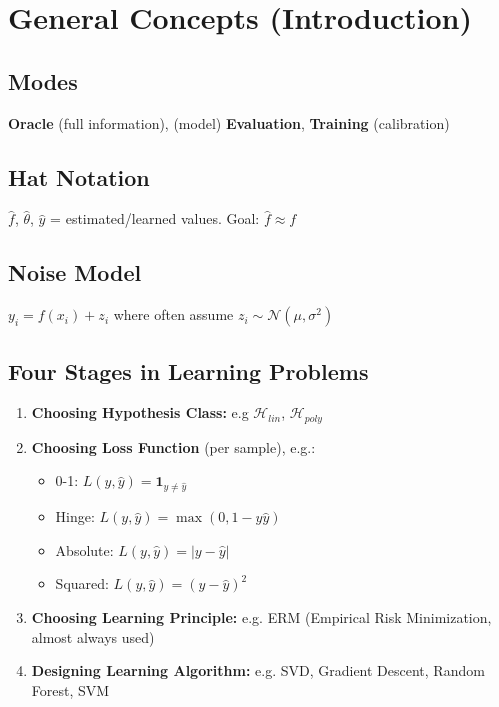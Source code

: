 \section{General Concepts (Introduction)}

\subsection{Modes}
\textbf{Oracle} (full information), (model) \textbf{Evaluation}, \textbf{Training} (calibration)

\subsection{Hat Notation}
$\hat{f}$, $\hat{\theta}$, $\hat{y}$ = estimated/learned values. Goal: $\hat{f} \approx f$

\subsection{Noise Model}
$y_i = f(x_i) + z_i$ where often assume $z_i \sim \mathcal{N}(\mu, \sigma^2)$

\subsection{Four Stages in Learning Problems}
\begin{enumerate}
    \item \textbf{Choosing Hypothesis Class:} e.g $\mathcal{H}_{\mathit{lin}}$, $\mathcal{H}_{\mathit{poly}}$
    \item \textbf{Choosing Loss Function} (per sample), e.g.:
          \begin{itemize}[nosep,leftmargin=\listindenttwo]
              \item 0-1: $L(y, \hat{y}) = \mathbf{1}_{y \neq \hat{y}}$
              \item Hinge: $L(y, \hat{y}) = \max(0, 1 - y\hat{y})$
              \item Absolute: $L(y, \hat{y}) = |y - \hat{y}|$
              \item Squared: $L(y, \hat{y}) = (y - \hat{y})^2$
          \end{itemize}
    \item \textbf{Choosing Learning Principle:} e.g. ERM (Empirical Risk Minimization, almost always used)
    \item \textbf{Designing Learning Algorithm:} e.g. SVD, Gradient Descent, Random Forest, SVM
\end{enumerate}

